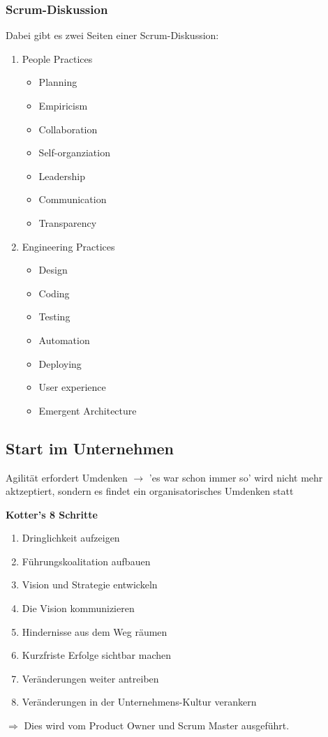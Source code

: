 \documentclass{report}
\theoremstyle{definition}
\theoremstyle{example}
\begin{document}
\subsubsection{Scrum-Diskussion}
Dabei gibt es zwei Seiten einer Scrum-Diskussion:
\begin{enumerate}
	\item { People Practices
		\begin{itemize}
			\item Planning
			\item Empiricism
			\item Collaboration
			\item Self-organziation
			\item Leadership
			\item Communication
			\item Transparency
		\end{itemize}
	}
	\item { Engineering Practices
		\begin{itemize}
			\item Design
			\item Coding
			\item Testing
			\item Automation
			\item Deploying
			\item User experience
			\item Emergent Architecture
		\end{itemize}
	}
\end{enumerate}

\subsection{Start im Unternehmen}
Agilität erfordert Umdenken $\rightarrow$ 'es war schon immer so' wird nicht mehr aktzeptiert, sondern es findet ein organisatorisches Umdenken statt

\textbf{Kotter's 8 Schritte}
\begin{enumerate}
	\item Dringlichkeit aufzeigen
	\item Führungskoalitation aufbauen
	\item Vision und Strategie entwickeln
	\item Die Vision kommunizieren
	\item Hindernisse aus dem Weg räumen
	\item Kurzfriste Erfolge sichtbar machen
	\item Veränderungen weiter antreiben
	\item Veränderungen in der Unternehmens-Kultur verankern
\end{enumerate}
$\Rightarrow$ Dies wird vom Product Owner und Scrum Master ausgeführt.
\end{document}
